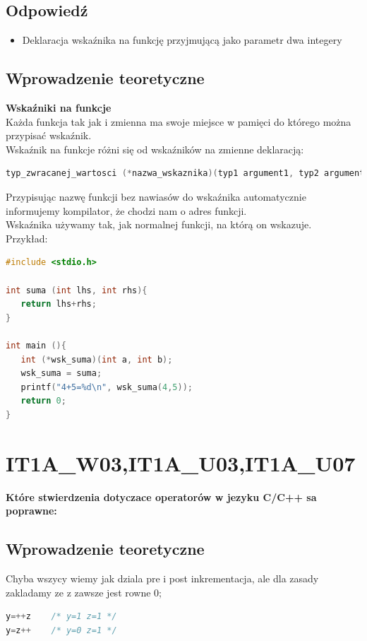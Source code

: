 \subsection{Odpowiedź}
\begin{itemize}
\item Deklaracja wskaźnika na funkcję przyjmującą jako parametr dwa integery\\
\end{itemize}

\subsection{Wprowadzenie teoretyczne}
\textbf{Wskaźniki na funkcje}\\
Każda funkcja tak jak i zmienna ma swoje miejsce w pamięci do którego można przypisać wskaźnik.\\
Wskaźnik na funkcje różni się od wskaźników na zmienne deklaracją:
\begin{lstlisting}[language=c]
typ_zwracanej_wartosci (*nazwa_wskaznika)(typ1 argument1, typ2 argument2, ...);
\end{lstlisting}
Przypisując nazwę funkcji bez nawiasów do wskaźnika automatycznie informujemy kompilator, że chodzi nam o adres funkcji.\\
Wskaźnika używamy tak, jak normalnej funkcji, na którą on wskazuje.\\
Przykład:
\begin{lstlisting}[language=c]
#include <stdio.h>

int suma (int lhs, int rhs){
   return lhs+rhs;
}
 
int main (){
   int (*wsk_suma)(int a, int b);
   wsk_suma = suma;
   printf("4+5=%d\n", wsk_suma(4,5));
   return 0;
}
\end{lstlisting}

\section{IT1A\_W03,IT1A\_U03,IT1A\_U07} 
\textbf{Które stwierdzenia dotyczace operatorów w jezyku C/C++ sa poprawne:}

\subsection{Wprowadzenie teoretyczne}
Chyba wszycy wiemy jak dziala pre i post inkrementacja, ale dla zasady
zakladamy ze z zawsze jest rowne 0;
\begin{lstlisting}[language=c]
y=++z    /* y=1 z=1 */
y=z++    /* y=0 z=1 */
\end{lstlisting}

